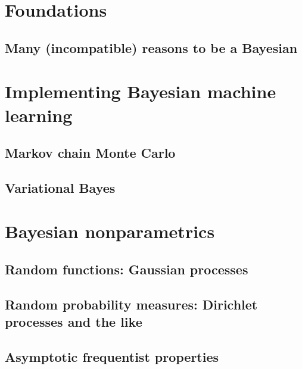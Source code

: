 \documentclass[11pt,fleqn]{book} %
\begin{document}

\part{Foundations}
    \label{ch:foundations}
    \chapter{Many (incompatible) reasons to be a Bayesian}
    

\part{Implementing Bayesian machine learning}
    \chapter{Markov chain Monte Carlo}
    
    \chapter{Variational Bayes}
    

\part{Bayesian nonparametrics}
	\label{ch:bnp}
    \chapter{Random functions: Gaussian processes}
    
    \chapter{Random probability measures: Dirichlet processes and the like}
    
    \chapter{Asymptotic frequentist properties}
    
\end{document}
